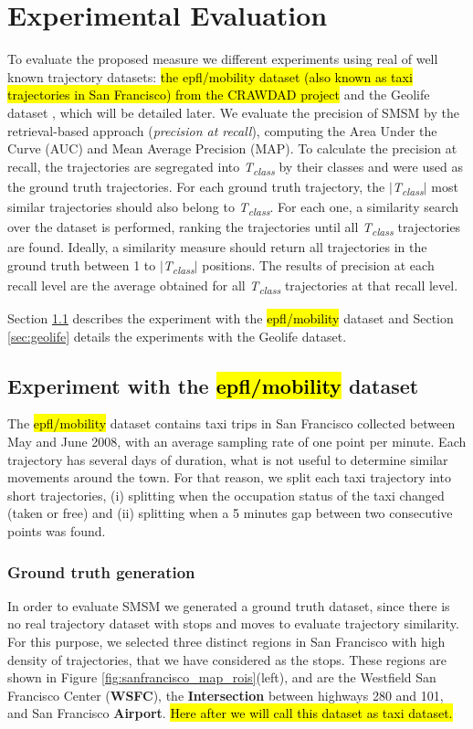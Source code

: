 \documentclass[12pt]{article}
\begin{document}
\section{Experimental Evaluation} \label{sec:experiments}
To evaluate the proposed measure we different experiments using real of well known trajectory datasets: \hl{the epfl/mobility dataset (also known as taxi trajectories in San Francisco) from the CRAWDAD project} \cite{epfl-mobility-20090224} and the Geolife dataset \cite{zheng2009mining}, which will be detailed later. We evaluate the precision of SMSM by the retrieval-based approach (\textit{precision at recall}), computing the Area Under the Curve (AUC) and Mean Average Precision (MAP). To calculate the precision at recall, the trajectories are segregated into \textit{T\textsubscript{class}} by their classes and were used as the ground truth trajectories. For each ground truth trajectory, the $|$\textit{T\textsubscript{class}}$|$ most similar trajectories should also belong to \textit{T\textsubscript{class}}. For each one, a similarity search over the dataset is performed, ranking the trajectories until all \textit{T\textsubscript{class}} trajectories are found. Ideally, a similarity measure should return all trajectories in the ground truth between 1 to $|$\textit{T\textsubscript{class}}$|$ positions. The results of precision at each recall level are the average obtained for all \textit{T\textsubscript{class}} trajectories at that recall level.

Section \ref{sec:crawdad} describes the experiment with the \hl{epfl/mobility} dataset and Section \ref{sec:geolife} details the experiments with the Geolife dataset.

\subsection{Experiment with the \hl{epfl/mobility} dataset}\label{sec:crawdad}

The \hl{epfl/mobility} dataset contains taxi trips in San Francisco collected between May and June 2008, with an average sampling rate of one point per minute. Each trajectory has several days of duration, what is not useful to determine similar movements around the town. For that reason, we split each taxi trajectory into short trajectories, (i) splitting when the occupation status of the taxi changed (taken or free) and (ii) splitting when a 5 minutes gap between two consecutive points was found.

\subsubsection{Ground truth generation}
In order to evaluate SMSM we generated a ground truth dataset, since there is no real trajectory dataset with stops and moves to evaluate trajectory similarity. For this purpose, we selected three distinct regions in San Francisco with high density of trajectories, that we have considered as the stops. These regions are shown in Figure \ref{fig:sanfrancisco_map_rois}(left), and are the Westfield San Francisco Center (\textbf{WSFC}), the \textbf{Intersection} between highways 280 and 101, and San Francisco \textbf{Airport}. \hl{Here after we will call this dataset as taxi dataset.}
\end{document}
